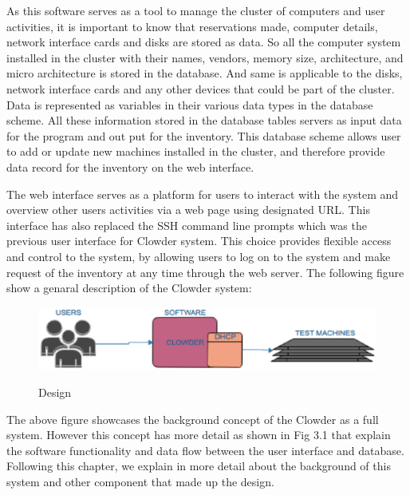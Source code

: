 As this software serves as a tool to manage the cluster of computers and user activities, it is important to know that  reservations made, computer details, network interface cards and disks are stored as data. So all the computer system installed in the cluster with their names, vendors, memory size, architecture, and micro architecture is stored in the database. And same is applicable to the disks, network interface cards and any other devices that could be part of the cluster. Data is represented as variables in their various data types in the database scheme.  All these information stored in the database tables servers as input  data for the program and out put for the inventory. This database scheme allows user to add or update new machines installed in the cluster, and therefore provide data record for the inventory on the web interface. 

The web interface serves as a platform for users to interact with the system and overview other users activities via a  web page using designated URL. This interface has also replaced the SSH command line prompts which was the previous user interface for Clowder system. This choice provides flexible access and control to the system, by allowing users to log on to the system and make request of the inventory at any time through the web server.
The following figure show a genaral description of the Clowder system:

\begin{figure}[h]
  \includegraphics[width=\linewidth]{background.eps}
  \label{fig:Design of program}
  \caption{Design}
\end{figure}
\pagebreak

The above figure showcases the background concept of the Clowder as a full system. However this concept has more detail as shown in Fig 3.1 that explain the software functionality and data flow between the user interface and database. Following this chapter, we explain in more detail about the background of this system and other component that made up the design.
